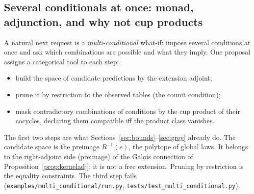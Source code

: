 \documentclass[11pt]{article}
\theoremstyle{definition}
\theoremstyle{remark}
\begin{document}
\subsection{Several conditionals at once: monad, adjunction, and why not cup products}\label{sec:multicond}
A natural next request is a \emph{multi-conditional} what-if: impose several conditions at once and ask which combinations are possible and what they imply. One proposal assigns a categorical tool to each step:
\begin{itemize}
  \item build the space of candidate predictions by the extension adjoint;
  \item prune it by restriction to the observed tables (the counit condition);
  \item mask contradictory combinations of conditions by the cup product of their cocycles, declaring them compatible iff the product class vanishes.
\end{itemize}
The first two steps are what Sections~\ref{sec:bounds}--\ref{sec:grey} already do. The candidate space is the preimage $R^{-1}(e)$, the polytope of global laws. It belongs to the right-adjoint side (preimage) of the Galois connection of Proposition~\ref{prop:kerneladj}; it is not a free extension. Pruning by restriction is the equality constraints. The third step fails (\texttt{examples/multi\_conditional/run.py}, \texttt{tests/test\_multi\_conditional.py}).
\end{document}
